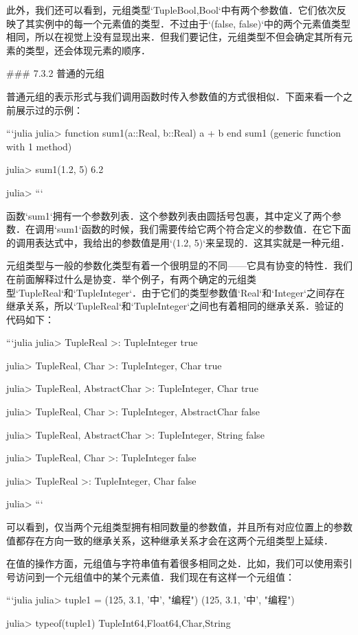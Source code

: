此外，我们还可以看到，元组类型`Tuple{Bool,Bool}`中有两个参数值．它们依次反映了其实例中的每一个元素值的类型．不过由于`(false, false)`中的两个元素值类型相同，所以在视觉上没有显现出来．但我们要记住，元组类型不但会确定其所有元素的类型，还会体现元素的顺序．

### 7.3.2 普通的元组

普通元组的表示形式与我们调用函数时传入参数值的方式很相似．下面来看一个之前展示过的示例：

```julia 
julia> function sum1(a::Real, b::Real)
           a + b
       end
sum1 (generic function with 1 method)

julia> sum1(1.2, 5)
6.2

julia> 
```

函数`sum1`拥有一个参数列表．这个参数列表由圆括号包裹，其中定义了两个参数．在调用`sum1`函数的时候，我们需要传给它两个符合定义的参数值．在它下面的调用表达式中，我给出的参数值是用`(1.2, 5)`来呈现的．这其实就是一种元组．

元组类型与一般的参数化类型有着一个很明显的不同——它具有协变的特性．我们在前面解释过什么是协变．举个例子，有两个确定的元组类型`Tuple{Real}`和`Tuple{Integer}`．由于它们的类型参数值`Real`‌和`Integer`之间存在继承关系，所以`Tuple{Real}`和`Tuple{Integer}`之间也有着相同的继承关系．验证的代码如下：

```julia
julia> Tuple{Real} >: Tuple{Integer}
true

julia> Tuple{Real, Char} >: Tuple{Integer, Char}
true

julia> Tuple{Real, AbstractChar} >: Tuple{Integer, Char}
true

julia> Tuple{Real, Char} >: Tuple{Integer, AbstractChar}
false

julia> Tuple{Real, AbstractChar} >: Tuple{Integer, String}
false

julia> Tuple{Real, Char} >: Tuple{Integer}
false

julia> Tuple{Real} >: Tuple{Integer, Char}
false

julia> 
```

可以看到，仅当两个元组类型拥有相同数量的参数值，并且所有对应位置上的参数值都存在方向一致的继承关系，这种继承关系才会在这两个元组类型上延续．

在值的操作方面，元组值与字符串值有着很多相同之处．比如，我们可以使用索引号访问到一个元组值中的某个元素值．我们现在有这样一个元组值：

```julia
julia> tuple1 = (125, 3.1, '中', "编程")
(125, 3.1, '中', "编程")

julia> typeof(tuple1)
Tuple{Int64,Float64,Char,String}

